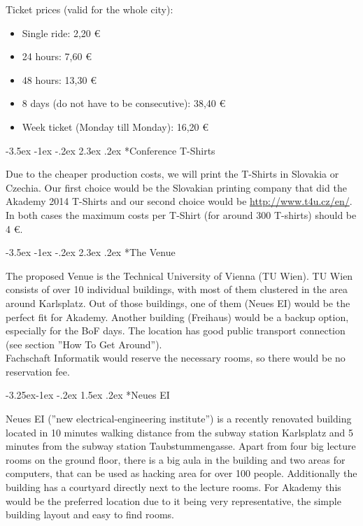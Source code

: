 \documentclass[10pt,a4paper]{article}
\makeatletter
\renewcommand\section{%
\@startsection{section}{1}{\z@}%
              {-3.5ex \@plus -1ex \@minus -.2ex}%
              {2.3ex \@plus.2ex}%
              {\color{kdelight}\sffamily\LARGE\bfseries}}
\renewcommand\subsection{%
\@startsection{subsection}{2}{\z@}%
              {-3.25ex\@plus -1ex \@minus -.2ex}%
              {1.5ex \@plus .2ex}%
              {\color{kdelight}\sffamily\Large\bfseries}}
\makeatother
\begin{document}
\vspace{10pt}
Ticket prices (valid for the whole city): 
\begin{itemize}
	\item Single ride: 2,20 \euro{}
	\item 24 hours: 7,60 \euro{}
	\item 48 hours: 13,30 \euro{}
	\item 8 days (do not have to be consecutive): 38,40 \euro{}
	\item Week ticket (Monday till Monday): 16,20 \euro{}
\end{itemize}

\cleardoublepage

\section*{Conference T-Shirts}
Due to the cheaper production costs, we will print the T-Shirts in Slovakia or Czechia. Our first choice would be the Slovakian printing company that did the Akademy 2014 T-Shirts and our second choice would be \url{http://www.t4u.cz/en/}. In both cases the maximum costs per T-Shirt (for around 300 T-shirts) should be 4 \euro{}.

\cleardoublepage

\section*{The Venue}
The proposed Venue is the Technical University of Vienna (TU Wien). TU Wien consists of over 10 individual buildings, with most of them clustered in the area around Karlsplatz. Out of those buildings, one of them (Neues EI) would be the perfect fit for Akademy. Another building (Freihaus) would be a backup option, especially for the BoF days. The location has good public transport connection (see section ''How To Get Around'').\\
Fachschaft Informatik would reserve the necessary rooms, so there would be no reservation fee.

\subsection*{Neues EI}

Neues EI (''new electrical-engineering institute'') is a recently renovated building located in 10 minutes walking distance from the subway station Karlsplatz and 5 minutes from the subway station Taubstummengasse. Apart from four big lecture rooms on the ground floor, there is a big aula in the building and two areas for computers, that can be used as hacking area for over 100 people. Additionally the building has a courtyard directly next to the lecture rooms. For Akademy this would be the preferred location due to it being very representative, the simple building layout and easy to find rooms.
\end{document}
